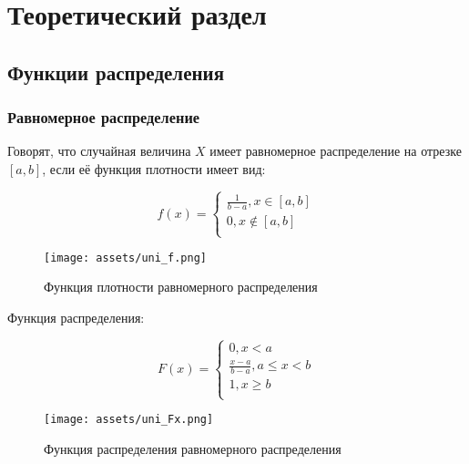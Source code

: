 \chapter{Теоретический раздел}

\section{Функции распределения}

\subsection{Равномерное распределение}
    
Говорят, что случайная величина $X$ имеет равномерное распределение на отрезке $[a,b]$, если её функция плотности имеет вид:

\begin{equation}
    f (x) =
    \begin{cases}
        \frac{1}{b-a}, x \in [a,b] \\
        0, x \notin [a, b] \\
    \end{cases}
\end{equation}

\begin{figure}[H]
    \begin{center}
    \texttt{[image: assets/uni\_f.png]}
    \caption{Функция плотности равномерного распределения}
    \label{fig:}
    \end{center}
\end{figure}

Функция распределения:

\begin{equation}
F (x) =
    \begin{cases}
        0, x < a \\
        \frac{x - a}{b - a}, a \le x < b \\
        1, x \geq b \\
    \end{cases}
\end{equation}

\begin{figure}[H]
    \begin{center}
    \texttt{[image: assets/uni\_Fx.png]}
    \caption{Функция распределения равномерного распределения}
    \label{fig:}
    \end{center}
\end{figure}

